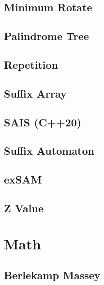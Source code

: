 \subsection{Minimum Rotate}

\subsection{Palindrome Tree}

\subsection{Repetition}

\subsection{Suffix Array}

\subsection{SAIS (C++20)}

\subsection{Suffix Automaton}

\subsection{exSAM}

% 
\subsection{Z Value}


\section{Math}
\subsection{Berlekamp Massey}

%
